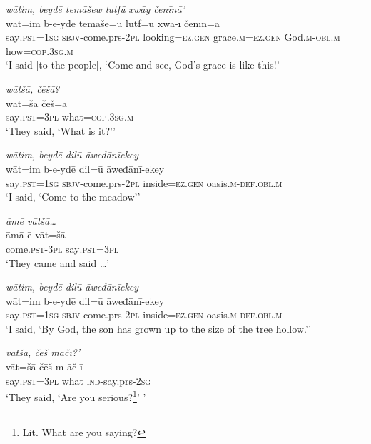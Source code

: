 \ea \label{ZQ.46}
\textit{wātim, beydē temāšew lutfū xwāy čenīnā’} \\ 
\gll wāt=im b-e-ydē temāše=ū lutf=ū xwā-ī čenīn=ā \\ 
 say\textsc{.pst}\textsc{=\textsc{1sg}} \textsc{sbjv-}come.prs-\textsc{2pl} looking\textsc{=ez.gen} grace\textsc{.m}\textsc{=ez.gen} God\textsc{.m}\textsc{-obl}\textsc{.m} how\textsc{=cop}\textsc{.3sg}\textsc{.m} \\ 
\glt `I said [to the people], ‘Come and see, God’s grace is like this!'
\z 
 
\ea \label{ZQ.47}
\textit{wātšā, čēšā?} \\ 
\gll wāt=šā čēš=ā \\ 
 say\textsc{.pst}\textsc{=3pl} what\textsc{=cop}\textsc{.3sg}\textsc{.m} \\ 
\glt `They said, ‘What is it?’'
\z 
 
\ea \label{ZQ.48}
\textit{wātim, beydē dilū āweđānīekey} \\ 
\gll wāt=im b-e-ydē dil=ū āweđānī-ekey \\ 
 say\textsc{.pst}\textsc{=\textsc{1sg}} \textsc{sbjv-}come.prs-\textsc{2pl} inside\textsc{=ez.gen} oasis\textsc{.m}\textsc{-def}\textsc{.obl}\textsc{.m} \\ 
\glt `I said, ‘Come to the meadow’'
\z 
 
\ea \label{ZQ.49}
\textit{āmē vātšā…} \\ 
\gll āmā-ē vāt=šā \\ 
 come\textsc{.pst}\textsc{-3pl} say\textsc{.pst}\textsc{=3pl} \\ 
\glt `They came and said …'
\z 
 
\ea \label{ZQ.50}
\textit{wātim, beydē dilū āweđānīekey} \\ 
\gll wāt=im b-e-ydē dil=ū āweđānī-ekey \\ 
 say\textsc{.pst}\textsc{=\textsc{1sg}} \textsc{sbjv-}come.prs-\textsc{2pl} inside\textsc{=ez.gen} oasis\textsc{.m}\textsc{-def}\textsc{.obl}\textsc{.m} \\ 
\glt `I said, ‘By God, the son has grown up to the size of the tree hollow.’'
\z 
 
\ea \label{ZQ.51}
\textit{vātšā, čēš māčī?’} \\ 
\gll vāt=šā čēš m-āč-ī \\ 
 say\textsc{.pst}\textsc{=3pl} what \textsc{ind-}say.prs-\textsc{2sg} \\ 
\glt `They said, ‘Are you serious?\footnote{Lit. What are you saying?}’ '
\z 
 
